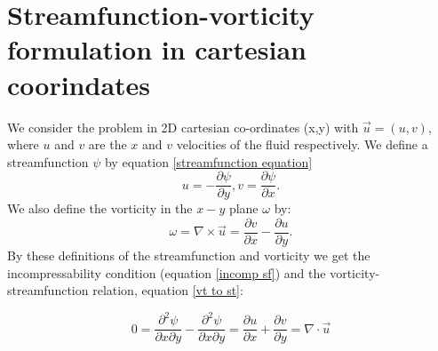 \documentclass{article}
\begin{document}
\section*{Streamfunction-vorticity formulation in cartesian coorindates}
We consider the problem in 2D cartesian co-ordinates (x,y) with $\vec{u}=(u,v)$, where $u$ and $v$ are the $x$ and $v$ velocities of the fluid respectively. We define a streamfunction $\psi$ by equation \ref{streamfunction equation}
\begin{equation}
	u = - \frac{\partial \psi}{\partial y}, v = \frac{\partial \psi}{\partial x}.
\end{equation}
We also define the vorticity in the $x-y$ plane $\omega$ by:
\begin{equation}
	\omega = \nabla \times \vec{u} = \frac{\partial v}{\partial x} - \frac{\partial u}{\partial y}.
	\label{vorticity}
\end{equation}
By these definitions of the streamfunction and vorticity we get the incompressability condition (equation \ref{incomp sf}) and the vorticity-streamfunction relation, equation \ref{vt to st}:

\begin{equation}
	0=\frac{\partial^2 \psi}{\partial x \partial y} - \frac{\partial^2 \psi}{\partial x \partial y} = \frac{\partial u}{\partial x} + \frac{\partial v}{\partial y} = \nabla \cdot \vec{u}
	\label{incompsf}
\end{equation}
\end{document}
